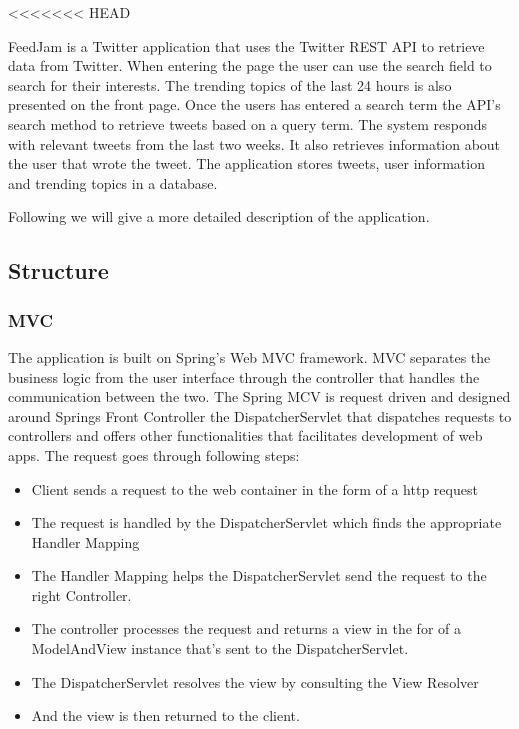 <<<<<<< HEAD

\label{sec:theApplication}
FeedJam is a Twitter application that uses the Twitter REST API to retrieve data from Twitter. When entering the page the user can use the search field to search for their interests. The trending topics of the last 24 hours is also presented on the front page. Once the users has entered a search term the API's search method to retrieve tweets based on a query term. 
The system responds with relevant tweets from the last two weeks. It also retrieves information about the user that wrote the tweet. The application stores tweets, user information and trending topics in a database. 

Following we will give a more detailed description of the application.

\subsection{Structure}

\subsubsection{MVC} %
\label{MVC}
The application is built on Spring's Web MVC framework. MVC separates the business logic from the user interface through the controller that handles the communication between the two. The Spring MCV is request driven and designed around Springs Front Controller the DispatcherServlet that dispatches requests to controllers and offers other functionalities that facilitates development of web apps. The request goes through following steps:

\begin{itemize}
\item Client sends a request to the web container in the form of a http request
\item The request is handled by the DispatcherServlet which finds the appropriate Handler Mapping
\item The Handler Mapping helps the DispatcherServlet send the request to the right Controller. 
\item The controller processes the request and returns a view in the for of a ModelAndView instance that's sent to the DispatcherServlet. 
\item The DispatcherServlet resolves the view by consulting the View Resolver
\item And the view is then returned to the client. 
\end{itemize}

